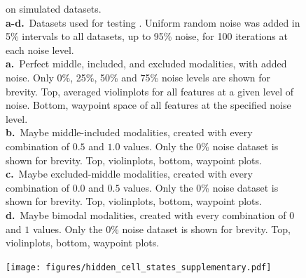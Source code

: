 \clearpage
\thispagestyle{facingcaption}
\begin{figure}[h]
\captionsetup{labelformat=prev-page}
\caption[\bonvoyage on simulated datasets.]{\bonvoyage on simulated datasets.\\
\textbf{a-d.}~Datasets used for testing \bonvoyage. Uniform random noise was added in 5\% intervals to all datasets, up to 95\% noise, for 100 iterations at each noise level.\\
\textbf{a.}~Perfect middle, included, and excluded modalities, with added noise. Only 0\%, 25\%, 50\% and 75\% noise levels are shown for brevity. Top, averaged violinplots for all features at a given level of noise. Bottom, waypoint space of all features at the specified noise level.\\
\textbf{b.}~Maybe middle-included modalities, created with every combination of $0.5$ and $1.0$ values. Only the 0\% noise dataset is shown for brevity. Top, violinplots, bottom, waypoint plots.\\
\textbf{c.}~Maybe excluded-middle modalities, created with every combination of $0.0$ and $0.5$ values. Only the 0\% noise dataset is shown for brevity. Top, violinplots, bottom, waypoint plots.\\
\textbf{d.}~Maybe bimodal modalities, created with every combination of $0$ and $1$ values. Only the 0\% noise dataset is shown for brevity. Top, violinplots, bottom, waypoint plots.\\
}
\label{fig:bonvoyage_simulations}


\end{figure}
\clearpage
\begin{figure}[h]
\ContinuedFloat
\captionsetup{labelformat=empty}
\centering
\texttt{[image: figures/hidden\_cell\_states\_supplementary.pdf]}
\end{figure}
\clearpage




